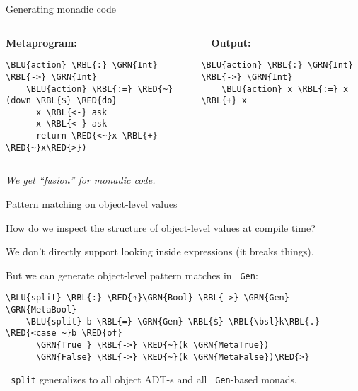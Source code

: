 \documentclass[dvipsnames,aspectratio=169]{beamer}
\theoremstyle{remark}
\newcommand{\RED}[1]{{\color{BrickRed} #1}}
\newcommand{\GRN}[1]{{\color{OliveGreen} #1}}
\newcommand{\RBL}[1]{{\color{RoyalBlue} #1}}
\newcommand{\BLU}[1]{{\color{Blue} #1}}
\newcommand{\bsl}{\textbackslash}
\begin{document}
\begin{frame}[fragile]{Generating monadic code}

\begin{columns}
\begin{column}{0.4\textwidth}
\textbf{Metaprogram:}
\begin{Verbatim}[commandchars=\\\{\}]
    \BLU{action} \RBL{:} \GRN{Int} \RBL{->} \GRN{Int}
    \BLU{action} \RBL{:=} \RED{~}(down \RBL{$} \RED{do}
      x \RBL{<-} ask
      x \RBL{<-} ask
      return \RED{<~}x \RBL{+} \RED{~}x\RED{>})
\end{Verbatim}
\end{column}

\begin{column}{0.5\textwidth}
\textbf{$\hspace{1em}$Output:}
\begin{Verbatim}[commandchars=\\\{\}]
    \BLU{action} \RBL{:} \GRN{Int} \RBL{->} \GRN{Int}
    \BLU{action} x \RBL{:=} x \RBL{+} x



\end{Verbatim}
\end{column}
\end{columns}
\vspace{2em}

\emph{We get ``fusion'' for monadic code.}

\end{frame}

\begin{frame}[fragile]{Pattern matching on object-level values}

How do we inspect the structure of object-level values at compile time?
\vspace{1em}

We don't directly support looking inside expressions (it breaks things).
\vspace{1em}

But we can generate object-level pattern matches in \texttt{\GRN{Gen}}:
\vspace{0.5em}
\begin{Verbatim}[commandchars=\\\{\}]
    \BLU{split} \RBL{:} \RED{⇑}\GRN{Bool} \RBL{->} \GRN{Gen} \GRN{MetaBool}
    \BLU{split} b \RBL{=} \GRN{Gen} \RBL{$} \RBL{\bsl}k\RBL{.} \RED{<case ~}b \RED{of}
      \GRN{True } \RBL{->} \RED{~}(k \GRN{MetaTrue})
      \GRN{False} \RBL{->} \RED{~}(k \GRN{MetaFalse})\RED{>}
\end{Verbatim}

\vspace{1em}
\texttt{\BLU{split}} generalizes to all object ADT-s and all \texttt{\GRN{Gen}}-based monads.

\end{frame}
\end{document}

